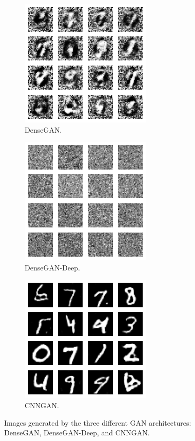 \documentclass{article}
\begin{document}
	\begin{figure}[htbp]
		\centering
		\begin{subfigure}[t]{0.32\textwidth}
			\centering
			\includegraphics[scale=0.39]{GAN_Dense_GenImage.png}
			\caption{DenseGAN.}
			\label{fig:GANImage_1}
		\end{subfigure}
		\begin{subfigure}[t]{0.32\textwidth}
			\centering
			\includegraphics[scale=0.39]{GAN_Dense_GenImage_Deep.png}
			\caption{DenseGAN-Deep.}
			\label{fig:GANImage_2}
		\end{subfigure}
		\begin{subfigure}[t]{0.32\textwidth}
			\centering
			\includegraphics[scale=0.39]{GAN_CNN_GenImage.png}
			\caption{CNNGAN.}
			\label{fig:GANImage_3}
		\end{subfigure}
		\caption{ Images generated by the three different GAN architectures: DenseGAN, DenseGAN-Deep, and CNNGAN.}
		\label{fig:ResultsGANImages}
	\end{figure}
\end{document}
